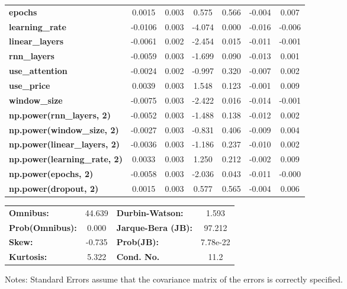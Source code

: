 \begin{center}
\begin{tabular}{lcccccc}
\textbf{epochs}                            &       0.0015  &        0.003     &     0.575  &         0.566        &       -0.004    &        0.007     \\
\textbf{learning\_rate}                    &      -0.0106  &        0.003     &    -4.074  &         0.000        &       -0.016    &       -0.006     \\
\textbf{linear\_layers}                    &      -0.0061  &        0.002     &    -2.454  &         0.015        &       -0.011    &       -0.001     \\
\textbf{rnn\_layers}                       &      -0.0059  &        0.003     &    -1.699  &         0.090        &       -0.013    &        0.001     \\
\textbf{use\_attention}                    &      -0.0024  &        0.002     &    -0.997  &         0.320        &       -0.007    &        0.002     \\
\textbf{use\_price}                        &       0.0039  &        0.003     &     1.548  &         0.123        &       -0.001    &        0.009     \\
\textbf{window\_size}                      &      -0.0075  &        0.003     &    -2.422  &         0.016        &       -0.014    &       -0.001     \\
\textbf{np.power(rnn\_layers, 2)}          &      -0.0052  &        0.003     &    -1.488  &         0.138        &       -0.012    &        0.002     \\
\textbf{np.power(window\_size, 2)}         &      -0.0027  &        0.003     &    -0.831  &         0.406        &       -0.009    &        0.004     \\
\textbf{np.power(linear\_layers, 2)}       &      -0.0036  &        0.003     &    -1.186  &         0.237        &       -0.010    &        0.002     \\
\textbf{np.power(learning\_rate, 2)}       &       0.0033  &        0.003     &     1.250  &         0.212        &       -0.002    &        0.009     \\
\textbf{np.power(epochs, 2)}               &      -0.0058  &        0.003     &    -2.036  &         0.043        &       -0.011    &       -0.000     \\
\textbf{np.power(dropout, 2)}              &       0.0015  &        0.003     &     0.577  &         0.565        &       -0.004    &        0.006     \\
\bottomrule
\end{tabular}
\begin{tabular}{lclc}
\textbf{Omnibus:}       & 44.639 & \textbf{  Durbin-Watson:     } &    1.593  \\
\textbf{Prob(Omnibus):} &  0.000 & \textbf{  Jarque-Bera (JB):  } &   97.212  \\
\textbf{Skew:}          & -0.735 & \textbf{  Prob(JB):          } & 7.78e-22  \\
\textbf{Kurtosis:}      &  5.322 & \textbf{  Cond. No.          } &     11.2  \\
\bottomrule
\end{tabular}
\end{center}

Notes: \newline
 [1] Standard Errors assume that the covariance matrix of the errors is correctly specified.